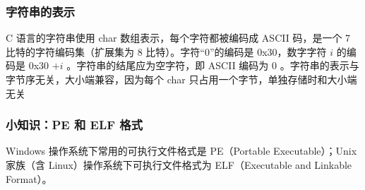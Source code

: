 \subsubsection{字符串的表示}
C 语言的字符串使用 char 数组表示，每个字符都被编码成 ASCII 码，是一个 7 比特的字符编码集（扩展集为 8 比特）。字符“0”的编码是 0x30，数字字符 \(i\) 的编码是 0x30 \(+ i\) 。字符串的结尾应为空字符，即 ASCII 编码为 0 。字符串的表示与字节序无关，大小端兼容，因为每个 char 只占用一个字节，单独存储时和大小端无关

\subsubsection{小知识：PE 和 ELF 格式}
Windows 操作系统下常用的可执行文件格式是 PE（Portable Executable）；Unix 家族（含 Linux）操作系统下可执行文件格式为 ELF（Executable and Linkable Format）。
